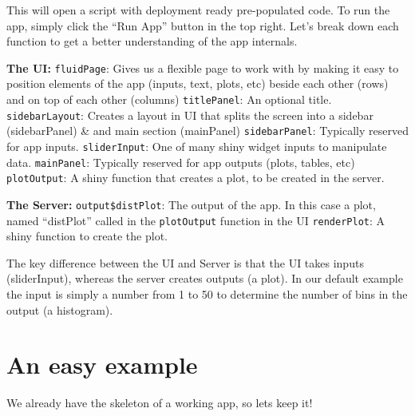 \documentclass[
]{book}
\begin{document}
This will open a script with deployment ready pre-populated code. To run the app, simply click the ``Run App'' button in the top right. Let's break down each function to get a better understanding of the app internals.

\textbf{The UI:}
\texttt{fluidPage}: Gives us a flexible page to work with by making it easy to position elements of the app (inputs, text, plots, etc) beside each other (rows) and on top of each other (columns)
\texttt{titlePanel}: An optional title.
\texttt{sidebarLayout}: Creates a layout in UI that splits the screen into a sidebar (sidebarPanel) \& and main section (mainPanel)
\texttt{sidebarPanel}: Typically reserved for app inputs.
\texttt{sliderInput}: One of many shiny widget inputs to manipulate data.
\texttt{mainPanel}: Typically reserved for app outputs (plots, tables, etc)
\texttt{plotOutput}: A shiny function that creates a plot, to be created in the server.

\textbf{The Server:}
\texttt{output\$distPlot}: The output of the app. In this case a plot, named ``distPlot'' called in the \texttt{plotOutput} function in the UI
\texttt{renderPlot}: A shiny function to create the plot.

The key difference between the UI and Server is that the UI takes inputs (sliderInput), whereas the server creates outputs (a plot). In our default example the input is simply a number from 1 to 50 to determine the number of bins in the output (a histogram).

\hypertarget{an-easy-example}{%
\section{An easy example}\label{an-easy-example}}

We already have the skeleton of a working app, so lets keep it!
\end{document}
